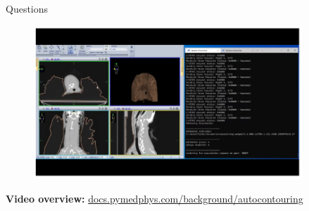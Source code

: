 \documentclass[9pt]{beamer}
\begin{document}
\begin{frame}{Questions}
  \begin{figure}
    \includegraphics[width=0.90\textwidth]{images/demo}
  \end{figure}
  \centering
  \textbf{Video overview:} \href{https://docs.pymedphys.com/background/autocontouring.html}{docs.pymedphys.com/background/autocontouring}
\end{frame}
%



\end{document}
